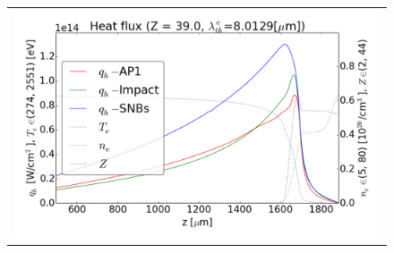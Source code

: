 
\begin{figure}[tbh]
  \begin{center}
    \begin{tabular}{c}
      \includegraphics[width=\figscale\textwidth]{../VFPdata/GD_Hohlraum/fluxes_10ps.png} 
    \end{tabular}
  \caption{
  }
  \label{fig:Gd_VFP_10ps_heatflux}
  \end{center} 
\end{figure}


%
